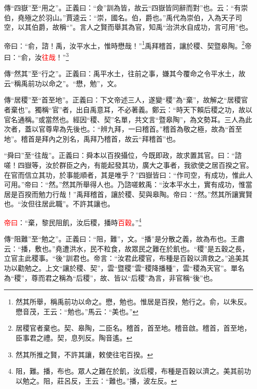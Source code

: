 {\noindent\zhuan{}\fzbyks 傳“四嶽”至“用之”。正義曰：“僉”訓為皆，故云“四嶽皆同辭而對”也。云：“有崇伯，堯殛之於羽山。”賈逵云：“崇，國名。伯，爵也。”禹代為崇伯，入為天子司空，以其伯爵，故稱“”。言人之賢而舉其為官，知禹“治洪水自成功，言可用”也。 \par}

帝曰：“俞，諮！禹，汝平水土，惟時懋哉！”\footnote{然其所舉，稱禹前功以命之。懋，勉也。惟居是百揆，勉行之。俞，以朱反。懋音茂，王云：“勉也。”馬云：“美也。”}禹拜稽首，讓於稷、契暨皋陶。\footnote{居稷官者棄也。契、皋陶，二臣名。稽首，首至地。稽音啟。稽首，首至地，臣事君之禮。契，息列反。陶音遙。}帝曰：“俞，汝\textcolor{red}{往哉}！”\footnote{然其所推之賢，不許其讓，敕使往宅百揆。}

{\noindent\zhuan{}\fzbyks 傳“然其”至“行之”。正義曰：禹平水土，往前之事，嫌其今覆命之令平水土，故云“稱禹前功以命之”。“懋，勉”，文。 \par}

{\noindent\zhuan{}\fzbyks 傳“居稷”至“首至地”。正義曰：下文帝述三人，遂變“稷”為“棄”，故解之“居稷官者棄也”。獨稱“官”者，出自禹意耳，不必著義。鄭云：“時天下賴后稷之功，故以官名通稱。”或當然也。經因“稷、契”名單，共文言“暨皋陶”，為文勢耳。三人為此次者，蓋以官尊卑為先後也。：“辨九拜，一曰稽首。”稽首為敬之極，故為“首至地”。稽首是拜內之別名，禹拜乃稽首，故云“拜稽首”也。 \par}

{\noindent\shu{}\fzkt “舜曰”至“往哉”。正義曰：舜本以百揆攝位，今既即政，故求置其官。曰：“諮嗟！四嶽等，汝於群臣之內，有能起發其功，廣大之事者，我欲使之居百揆之官。在官而信立其功，於事能順者，其是唯乎？”四嶽皆曰：“作司空，有成功，惟此人可用。”帝曰：“然。”然其所舉得人也。乃諮嗟敕禹：“汝本平水土，實有成功，惟當居是百揆而勉力行哉！”禹拜稽首，讓於稷、契與皋陶。帝曰：“然。”然其所讓實賢也。“汝但往居此職”。不許其讓也。 \par}

\textcolor{red}{帝曰}：“棄，黎民阻飢，汝后稷，播時\textcolor{red}{百穀}。”\footnote{阻，難。播，布也。眾人之難在於飢，汝后稷，布種是百穀以濟之。美其前功以勉之。阻，莊呂反，王云：“難也。”播，波左反。}

{\noindent\zhuan{}\fzbyks 傳“阻難”至“勉之”。正義曰：“阻，難”，文。“播”是分散之義，故為布也。王肅云：“播，敷也。”堯遭洪水，民不粒食，故眾民之難在於飢也。“稷”是五穀之長，立官主此稷事。“後”訓君也。帝言：“汝君此稷官，布種是百穀以濟救之。”追美其功以勸勉之。上文“讓於稷、契”，雲“暨稷”雲“稷降播種”，雲“稷為天官”。單名為“稷”，尊而君之稱為“后稷”，故、皆以“后稷”為言，非官稱“後”也。 \par}

